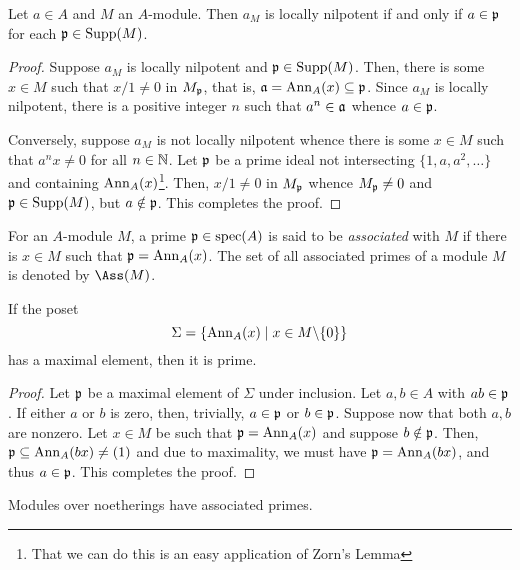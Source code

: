 \begin{proposition}
    Let $a\in A$ and $M$ an $A$-module. Then $a_M$ is locally nilpotent if and only if $a\in\mathfrak p$ for each $\mathfrak p\in\operatorname{Supp}(M)$.
\end{proposition}
\begin{proof}
    Suppose $a_M$ is locally nilpotent and $\mathfrak p\in\operatorname{Supp}(M)$. Then, there is some $x\in M$ such that $x/1\ne 0$ in $M_\mathfrak p$, that is, $\mathfrak a = \operatorname{Ann}_A(x)\subseteq\mathfrak p$. Since $a_M$ is locally nilpotent, there is a positive integer $n$ such that $a^n\in\mathfrak a$ whence $a\in\mathfrak p$. 

    Conversely, suppose $a_M$ is not locally nilpotent whence there is some $x\in M$ such that $a^nx\ne0$ for all $n\in\mathbb{N}$. Let $\mathfrak p$ be a prime ideal not intersecting $\{1,a,a^2,\dots\}$ and containing $\operatorname{Ann}_A(x)$\footnote{That we can do this is an easy application of Zorn's Lemma}. Then, $x/1\ne 0$ in $M_\mathfrak p$ whence $M_\mathfrak p\ne 0$ and $\mathfrak p\in\operatorname{Supp}(M)$, but $a\notin\mathfrak p$. This completes the proof.
\end{proof}

\begin{definition}
    For an $A$-module $M$, a prime $\mathfrak p\in\operatorname{spec}(A)$ is said to be \emph{associated} with $M$ if there is $x\in M$ such that $\mathfrak p = \operatorname{Ann}_A(x)$. The set of all associated primes of a module $M$ is denoted by $\Ass(M)$.
\end{definition}

\begin{proposition}
    If the poset 
    \begin{equation*}
        \Sigma = \{\operatorname{Ann}_A(x)\mid x\in M\backslash\{0\}\}
    \end{equation*}
    has a maximal element, then it is prime.
\end{proposition}
\begin{proof}
    Let $\mathfrak p$ be a maximal element of $\Sigma$ under inclusion. Let $a,b\in A$ with $ab\in\mathfrak p$. If either $a$ or $b$ is zero, then, trivially, $a\in\mathfrak p$ or $b\in\mathfrak p$. Suppose now that both $a,b$ are nonzero. Let $x\in M$ be such that $\mathfrak p = \operatorname{Ann}_A(x)$ and suppose $b\notin\mathfrak p$. Then, $\mathfrak p\subseteq\operatorname{Ann}_A(bx)\ne(1)$ and due to maximality, we must have $\mathfrak p = \operatorname{Ann}_A(bx)$, and thus $a\in\mathfrak p$. This completes the proof.
\end{proof}

\begin{corollary}
    Modules over noetherings have associated primes.
\end{corollary}

